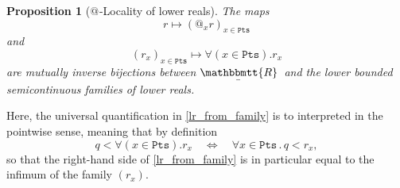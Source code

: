 \documentclass[reqno,11pt]{amsproc}
\makeatletter
\theoremstyle{plain}
\newtheorem{proposition}[theorem]{Proposition}
\theoremstyle{definition}
\newcommand{\ubar}[1]{\underaccent{\bar}{#1}}
\newcommand{\internal}[1]{\raisebox{-.03ex}{$\mathbbmtt{#1}$}}
\newcommand{\hs}{\hspace{1pt}}
\newcommand{\trr}{\internal{R}}
\newcommand{\tlrr}{\ubar{\trr}\hs}
\newcommand{\pt}{x}
\newcommand{\pts}{\mathtt{Pts}}		%
\newcommand{\atsymbol}{{@}}
\newcommand{\at}[1][\pt]{\atsymbol_{#1}}
\newcommand{\beq}{\begin{equation}}
\newcommand{\eeq}{\end{equation}}
\numberwithin{equation}{section}
\makeatother
\begin{document}
\begin{proposition}[{$\at[]$-Locality of lower reals}]
	\label{LR_locality}
	The maps
	\[
		r \longmapsto (\at r)_{\pt\in\pts}
	\]
	and
	\beq
		\label{lr_from_family}
		(r_\pt)_{\pt\in\pts} \longmapsto \forall(\pt \in \pts).r_\pt
	\eeq
	are mutually inverse bijections between $\tlrr$ and the lower bounded semicontinuous families of lower reals.
\end{proposition}

Here, the universal quantification in \eqref{lr_from_family} is to interpreted in the pointwise sense, meaning that by definition
\[
	q < \forall (\pt \in \pts) . r_\pt \quad \Longleftrightarrow \quad \forall \pt \in \pts \, . \, q < r_\pt,
\]
so that the right-hand side of \eqref{lr_from_family} is in particular equal to the infimum of the family $(r_x)$.
\end{document}

